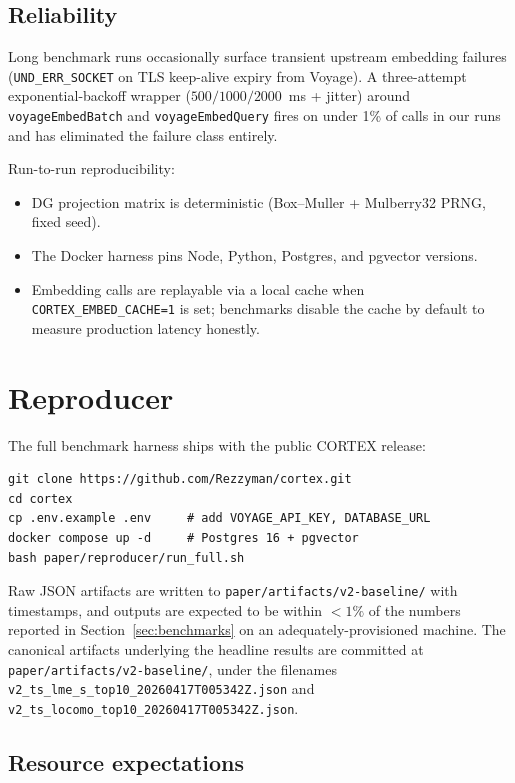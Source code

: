 \documentclass{article}
\begin{document}
\subsection{Reliability}

Long benchmark runs occasionally surface transient upstream embedding
failures (\texttt{UND\_ERR\_SOCKET} on TLS keep-alive expiry from
Voyage). A three-attempt exponential-backoff wrapper
($500 / 1000 / 2000$~ms + jitter) around \texttt{voyageEmbedBatch} and
\texttt{voyageEmbedQuery} fires on under 1\% of calls in our runs and
has eliminated the failure class entirely.

Run-to-run reproducibility:

\begin{itemize}
  \item DG projection matrix is deterministic (Box--Muller + Mulberry32
        PRNG, fixed seed).
  \item The Docker harness pins Node, Python, Postgres, and pgvector
        versions.
  \item Embedding calls are replayable via a local cache when
        \texttt{CORTEX\_EMBED\_CACHE=1} is set; benchmarks disable the
        cache by default to measure production latency honestly.
\end{itemize}

\section{Reproducer}
\label{sec:reproducer}

The full benchmark harness ships with the public CORTEX release:

\begin{verbatim}
git clone https://github.com/Rezzyman/cortex.git
cd cortex
cp .env.example .env     # add VOYAGE_API_KEY, DATABASE_URL
docker compose up -d     # Postgres 16 + pgvector
bash paper/reproducer/run_full.sh
\end{verbatim}

Raw JSON artifacts are written to
\texttt{paper/artifacts/v2-baseline/} with timestamps, and outputs are
expected to be within $< 1\%$ of the numbers reported in
Section~\ref{sec:benchmarks} on an adequately-provisioned machine. The
canonical artifacts underlying the headline results are committed at
\texttt{paper/artifacts/v2-baseline/}, under the filenames
\texttt{v2\_ts\_lme\_s\_top10\_20260417T005342Z.json} and
\texttt{v2\_ts\_locomo\_top10\_20260417T005342Z.json}.

\subsection{Resource expectations}
\end{document}
